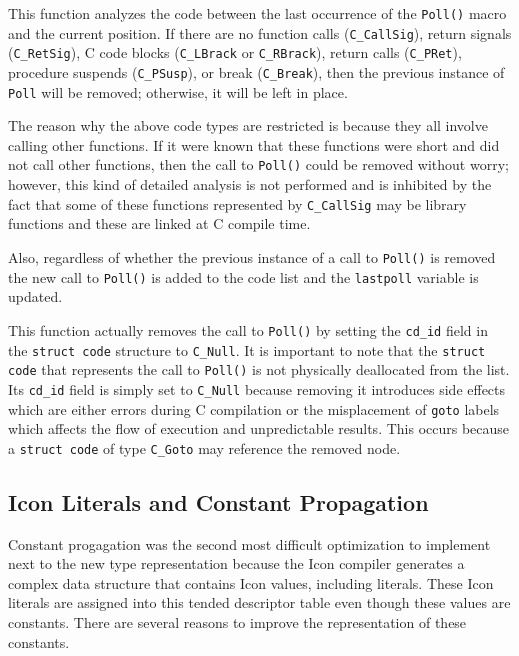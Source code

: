 
This function analyzes the code between the last occurrence of the
\texttt{Poll()} macro and the current position. If there are no
function calls (\texttt{C\_CallSig}), return signals
(\texttt{C\_RetSig}), C code blocks (\texttt{C\_LBrack} or
\texttt{C\_RBrack}), return calls (\texttt{C\_PRet}), procedure
suspends (\texttt{C\_PSusp}), or break (\texttt{C\_Break}), then the
previous instance of \texttt{Poll} will be removed; otherwise, it will
be left in place.

The reason why the above code types are restricted is because they all
involve calling other functions. If it were known that these functions
were short and did not call other functions, then the call to
\texttt{Poll()} could be removed without worry; however, this kind of
detailed analysis is not performed and is inhibited by the fact that
some of these functions represented by \texttt{C\_CallSig} may be
library functions and these are linked at C compile time.

Also, regardless of whether the previous instance of a call to
\texttt{Poll()} is removed the new call to \texttt{Poll()} is added to
the code list and the \texttt{lastpoll} variable is updated.



This function actually removes the call to \texttt{Poll()} by setting
the \texttt{cd\_id} field in the \texttt{struct code} structure to
\texttt{C\_Null}. It is important to note that the \texttt{struct
code} that represents the call to \texttt{Poll()} is not physically
deallocated from the list. Its \texttt{cd\_id} field is simply set
to \texttt{C\_Null} because removing it introduces side effects which
are either errors during C compilation or the misplacement of
\texttt{goto} labels which affects the flow of execution and
unpredictable results. This occurs because a \texttt{struct code}
of type \texttt{C\_Goto} may reference the removed node.

\subsection{Icon Literals and Constant Propagation}

Constant progagation was the second most difficult optimization to
implement next to the new type representation because the Icon
compiler generates a complex data structure that contains Icon values,
including literals. These Icon literals are assigned into this tended
descriptor table even though these values are constants. There are
several reasons to improve the representation of these constants.

